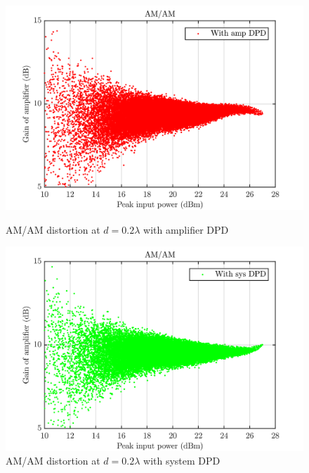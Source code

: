 \begin{figure}[H]
  \centering
  \begin{minipage}[b]{0.5\textwidth}
	\includegraphics[scale = 0.5]{figures/measurement/cree/meas3/amam_amp_dpd_0p2.png}
	\caption{AM/AM distortion at $d = 0.2\lambda$ with amplifier DPD}	
    \label{fig:meas4_amam3}
  \end{minipage}
  \hfill
  \begin{minipage}[b]{0.4\textwidth}
	\includegraphics[scale = 0.5]{figures/measurement/cree/meas3/amam_sys_dpd_0p2.png}
	\caption{AM/AM distortion at $d = 0.2\lambda$ with system DPD}
    \label{fig:meas4_amam4}
  \end{minipage}
\end{figure}

